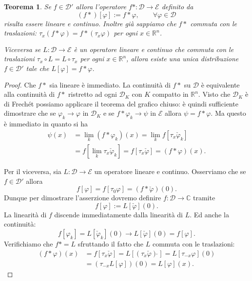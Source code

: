 \documentclass[italian,a4paper,oneside,headinclude]{scrbook}
\renewcommand{\phi}{\varphi}
\newcommand{\D}{\mathcal D}
\newcommand{\E}{\mathcal E}
\newcommand{\CC}{\mathbb C}
\newcommand{\RR}{\mathbb R}
\newcommand{\defeq}{:=}
\newtheorem{theorem}{Teorema}
\begin{document}
\begin{theorem}
  Se $f\in \D'$ allora l'operatore $f*\colon \D\to \E$ definito
  da
  \[
  (f*)[\phi] \defeq f*\phi, \qquad \forall \phi\in\D
  \]
  risulta essere lineare e
  continuo. Inoltre già sappiamo che $f*$ commuta con le traslazioni:
  $\tau_x (f*\phi) = f*(\tau_x \phi)$ per ogni $x\in \RR^n$.

  Viceversa se $L\colon \D\to\E$ è un operatore lineare e
  continuo che commuta con le traslazioni
  $\tau_x\circ L = L \circ \tau_x$ per ogni $x\in \RR^n$,
  allora esiste una unica
  distribuzione $f\in \D'$ tale che $L[\phi]=f*\phi$.
\end{theorem}
%
\begin{proof}
  Che $f*$ sia lineare è immediato. La continuità di $f*$ su $\D$ è
  equivalente alla continuità di $f*$ ristretto ad ogni $\D_K$ con $K$
  compatto in $\RR^n$. Visto  che $\D_K$ è di Frechét possiamo
  applicare il teorema del grafico chiuso: è quindi sufficiente
  dimostrare che se $\phi_k\to \phi$ in $\D_K$ e se $f*\phi_k\to \psi$
  in $\E$ allora $\psi = f*\phi$. Ma questo è immediato in
  quanto si ha
  \begin{align*}
    \psi(x) &= \lim_k (f*\phi_k)(x)
    = \lim_k f[\tau_x \check \phi_k]\\
    &= f[\lim_k \tau_x \check \phi_k]
    = f[\tau_x \check \phi]
    = (f*\phi)(x).
  \end{align*}

  Per il viceversa, sia $L\colon \D \to \E$ un operatore
  lineare e continuo. Osserviamo che se $f\in \D'$ allora
  \[
  f[\phi] = f[\tau_0 \phi] = (f * \check \phi)(0).
  \]
  Dunque per dimostrare l'asserzione dovremo definire
  $f\colon \D\to \CC$ tramite
  \[
  f[\phi]\defeq L[\check \phi](0).
  \]
  La linearità di $f$ discende immediatamente dalla linearità di $L$.
  Ed anche la continuità:
  \[
   f[\phi_k] = L[\check \phi_k](0) \to L[\check \phi](0) = f[\phi].
  \]
  Verifichiamo che $f*=L$ sfruttando il fatto che $L$ commuta con le
  traslazioni:
  \begin{align*}
    (f*\phi)(x) &= f[\tau_x \check \phi]
    = L[(\tau_x \check \phi)\check\,]
    = L[\tau_{-x}\phi](0) \\
    &= (\tau_{-x} L[\phi])(0)
    = L[\phi](x).
  \end{align*}
\end{proof}

\begin{comment}
Osserviamo che se $f\in \E'$ allora l'operatore $f*$ definito da
$f*[\phi]=f*\phi$ può essere visto come operatore $\E\to \E$ o anche
$\D\to\D$.
\end{comment}
\end{document}
